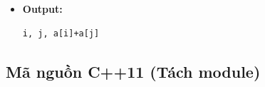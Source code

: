 \begin{itemize}
\begin{itemize}
        \item \textbf{Module 3 (Ghi file):}
        \begin{itemize}
            \item Ghi:
\begin{lstlisting}
i, j, a[i]+a[j]
\end{lstlisting}
        \end{itemize}
    \end{itemize}

    \item \textbf{Output:}
\begin{lstlisting}
i, j, a[i]+a[j]
\end{lstlisting}
\end{itemize}

\subsection{Mã nguồn C++11 (Tách module)}
